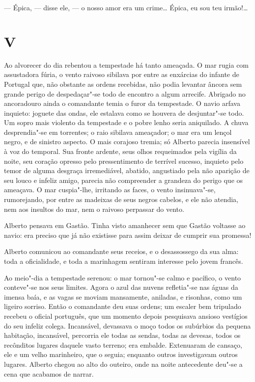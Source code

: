 --- Épica, --- disse ele, --- o nosso amor era um crime\ldots{} Épica, eu sou
teu irmão!\ldots{}

\section*{V}

Ao alvorecer do dia rebentou a tempestade há tanto ameaçada. O mar rugia
com assustadora fúria, o vento raivoso sibilava por entre as enxárcias
do infante de Portugal que, não obstante as ordens recebidas, não podia
levantar âncora sem grande perigo de despedaçar"-se todo de encontro a
algum arrecife. Abrigado no ancoradouro ainda o comandante temia o furor
da tempestade. O navio arfava inquieto: joguete das ondas, ele estalava
como se houvera de desjuntar"-se todo. Um sopro mais violento da
tempestade e o pobre lenho seria aniquilado. A chuva desprendia"-se em
torrentes; o raio sibilava ameaçador; o mar era um lençol negro, e de
sinistro aspecto. O mais corajoso tremia; só Alberto parecia insensível
à voz do temporal. Sua fronte ardente, seus olhos requeimados pela
vigília da noite, seu coração opresso pelo pressentimento de terrível
sucesso, inquieto pelo temor de alguma desgraça irremediável, abatido,
angustiado pela não aparição de seu louco e infeliz amigo, parecia não
compreender a grandeza do perigo que os ameaçava. O mar cuspia"-lhe,
irritando as faces, o vento insinuava"-se, rumorejando, por entre as
madeixas de seus negros cabelos, e ele não atendia, nem aos insultos do
mar, nem o raivoso perpassar do vento.

Alberto pensava em Gastão. Tinha visto amanhecer sem que Gastão voltasse
ao navio: era preciso que já não existisse para assim deixar de cumprir
sua promessa!

Alberto comunicou ao comandante seus receios, e o desassossego da sua
alma: toda a oficialidade, e toda a marinhagem sentiram interesse pelo
jovem francês.

Ao meio"-dia a tempestade serenou: o mar tornou"-se calmo e pacífico, o
vento conteve"-se nos seus limites. Agora o azul das nuvens refletia"-se
nas águas da imensa baía, e as vagas se moviam mansamente, aniladas, e
risonhas, como um ligeiro sorriso. Então o comandante deu suas ordens;
um escaler bem tripulado recebeu o oficial português, que um momento
depois pesquisava ansioso vestígios do seu infeliz colega. Incansável,
devassava o moço todos os subúrbios da pequena habitação, incansável,
percorria ele todas as sendas, todas as devesas, todos os recônditos
lugares daquele vasto terreno; era embalde. Extenuaram de cansaço, ele e
um velho marinheiro, que o seguia; enquanto outros investigavam outros
lugares. Alberto chegou ao alto do outeiro, onde na noite antecedente
deu"-se a cena que acabamos de narrar.

